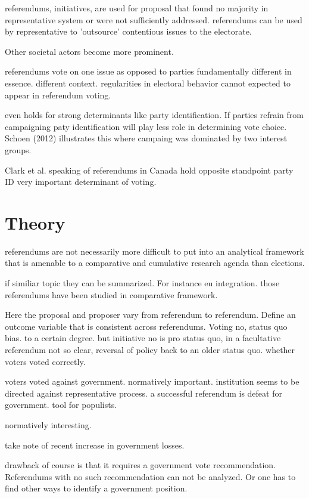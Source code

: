 \documentclass[11pt,a4paper]{article}\usepackage[]{graphicx}\usepackage[]{color}
\begin{document}
referendums, initiatives, are used for proposal that found no majority in representative system or were not sufficiently addressed. referendums can be used by representative to 'outsource' contentious issues to the electorate. 

Other societal actors become more prominent. 

referendums vote on one issue as opposed to parties fundamentally different in essence. different context. regularities in electoral behavior cannot expected to appear in referendum voting.

even holds for strong determinants like party identification. If parties refrain from campaigning paty identification will play less role in determining vote choice. Schoen (2012) illustrates this where campaing was dominated by two interest groups.

Clark et al. speaking of referendums in Canada hold opposite standpoint party ID very important determinant of voting.



\section{Theory}\label{sec:theory}

referendums are not necessarily more difficult to put into an analytical framework that is amenable to a comparative and cumulative research agenda than elections.

if similiar topic they can be summarized. For instance eu integration. those referendums have been studied in comparative framework.

Here the proposal and proposer vary from referendum to referendum. 
Define an outcome variable that is consistent across referendums. Voting no, status quo bias. to a certain degree. but initiative no is pro status quo, in a facultative referendum not so clear, reversal of policy back to an older status quo. whether voters voted correctly. 

voters voted against government. normatively important. institution seems to be directed against representative process. a successful referendum is defeat for government. tool for populists.

normatively interesting.

take note of recent increase in government losses.

drawback of course is that it requires a government vote recommendation. Referendums
with no such recommendation can not be analyzed. Or one has to find other ways to
identify a government position.
\end{document}
